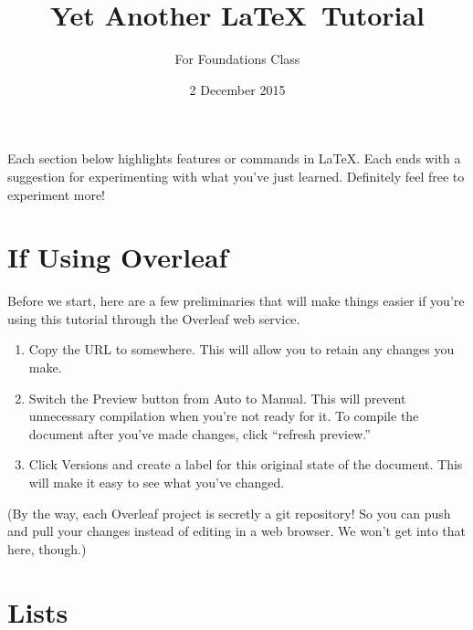 \documentclass{article}
\title{Yet Another \LaTeX\ Tutorial}
\author{For Foundations Class}
\date{2 December 2015}
\begin{document}

\maketitle


Each section below highlights features or commands in \LaTeX.
Each ends with a suggestion for experimenting with what you've just learned.
Definitely feel free to experiment more!

\section{If Using Overleaf} %
\label{sec:overleaf}        %

Before we start, here are a few preliminaries that will make things easier if you're using this tutorial through the Overleaf web service.

\begin{enumerate}
    \item Copy the URL to somewhere.  This will allow you to retain any changes you make.
    \item Switch the Preview button from Auto to Manual.  This will prevent unnecessary compilation when you're not ready for it.  To compile the document after you've made changes, click ``refresh preview.''
    \item Click Versions and create a label for this original state of the document.  This will make it easy to see what you've changed.
\end{enumerate}

(By the way, each Overleaf project is secretly a git repository!
So you can push and pull your changes instead of editing in a web browser.
We won't get into that here, though.)

\section{Lists}
\label{sec:lists}
\end{document}
